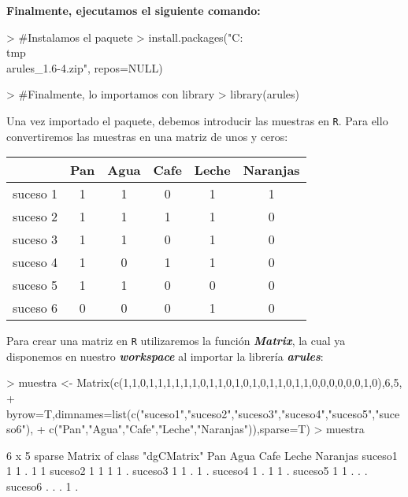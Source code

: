 \documentclass [a4paper] {article}
\begin{document}
\hfil \textbf{Finalmente, ejecutamos el siguiente comando:} \par
\begin{Schunk}
\begin{Sinput}
> #Instalamos el paquete
> install.packages("C:\\tmp\\arules_1.6-4.zip", repos=NULL)
\end{Sinput}
\end{Schunk}
\begin{Schunk}
\begin{Sinput}
> #Finalmente, lo importamos con library
> library(arules)
\end{Sinput}
\end{Schunk}

Una vez importado el paquete, debemos introducir las muestras en \texttt{R}. Para ello convertiremos las muestras en una matriz de unos y ceros:

\newpage

\begin{center}
\begin{tabular}{|c|c|c|c|c|c|}
\hline
         & Pan & Agua & Cafe & Leche & Naranjas \\ \hline
suceso 1 & 1   & 1    & 0    & 1     & 1        \\ \hline
suceso 2 & 1   & 1    & 1    & 1     & 0        \\ \hline
suceso 3 & 1   & 1    & 0    & 1     & 0        \\ \hline
suceso 4 & 1   & 0    & 1    & 1     & 0        \\ \hline
suceso 5 & 1   & 1    & 0    & 0     & 0        \\ \hline
suceso 6 & 0   & 0    & 0    & 1     & 0        \\ \hline
\end{tabular}
\end{center}

Para crear una matriz en \texttt{R} utilizaremos la función \textbf{\textit{Matrix}}, la cual ya disponemos en nuestro \textbf{\textit{workspace}} 
al importar la librería \textbf{\textit{arules}}:
\begin{Schunk}
\begin{Sinput}
> muestra <- Matrix(c(1,1,0,1,1,1,1,1,1,0,1,1,0,1,0,1,0,1,1,0,1,1,0,0,0,0,0,0,1,0),6,5,
+ byrow=T,dimnames=list(c("suceso1","suceso2","suceso3","suceso4","suceso5","suceso6"),
+ c("Pan","Agua","Cafe","Leche","Naranjas")),sparse=T)
> muestra
\end{Sinput}
\begin{Soutput}
6 x 5 sparse Matrix of class "dgCMatrix"
        Pan Agua Cafe Leche Naranjas
suceso1   1    1    .     1        1
suceso2   1    1    1     1        .
suceso3   1    1    .     1        .
suceso4   1    .    1     1        .
suceso5   1    1    .     .        .
suceso6   .    .    .     1        .
\end{Soutput}
\end{Schunk}
\end{document}
